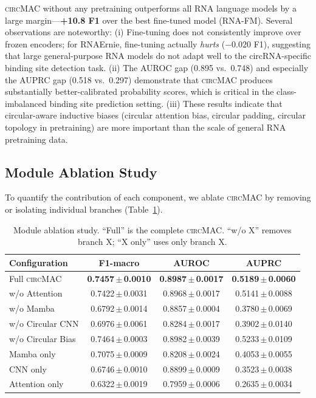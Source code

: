 \documentclass[11pt]{article}
\newcommand{\model}{\textsc{circMAC}}
\newcommand{\best}[1]{\textbf{#1}}
\newcommand{\spm}{\,\ensuremath{\pm}\,}
\begin{document}
\model{} without any pretraining outperforms all RNA language models by a
large margin---\textbf{+10.8 F1} over the best fine-tuned model (RNA-FM).
Several observations are noteworthy:
(i) Fine-tuning does not consistently improve over frozen encoders;
for RNAErnie, fine-tuning actually \textit{hurts} ($-0.020$ F1), suggesting
that large general-purpose RNA models do not adapt well to the
circRNA-specific binding site detection task.
(ii) The AUROC gap (0.895 vs.~0.748) and especially the AUPRC gap (0.518
vs.~0.297) demonstrate that \model{} produces substantially better-calibrated
probability scores, which is critical in the class-imbalanced binding site
prediction setting.
(iii) These results indicate that circular-aware inductive biases
(circular attention bias, circular padding, circular topology in pretraining)
are more important than the scale of general RNA pretraining data.


\subsection{Module Ablation Study}
\label{sec:ablation}

To quantify the contribution of each component, we ablate \model{} by
removing or isolating individual branches (Table~\ref{tab:ablation}).

\begin{table}[htbp]
\centering
\caption{Module ablation study. ``Full'' is the complete \model{}.
         ``w/o X'' removes branch X; ``X only'' uses only branch X.}
\label{tab:ablation}
\renewcommand{\arraystretch}{1.15}
\begin{tabular}{lccc}
\toprule
\textbf{Configuration} & \textbf{F1-macro} & \textbf{AUROC} & \textbf{AUPRC} \\
\midrule
Full \model{}         & \best{0.7457\spm 0.0010} & \best{0.8987\spm 0.0017} & \best{0.5189\spm 0.0060} \\
\midrule
w/o Attention         & 0.7422\spm 0.0031 & 0.8968\spm 0.0017 & 0.5141\spm 0.0088 \\
w/o Mamba             & 0.6792\spm 0.0014 & 0.8857\spm 0.0004 & 0.3780\spm 0.0069 \\
w/o Circular CNN      & 0.6976\spm 0.0061 & 0.8284\spm 0.0017 & 0.3902\spm 0.0140 \\
w/o Circular Bias     & 0.7464\spm 0.0003 & 0.8982\spm 0.0039 & 0.5233\spm 0.0109 \\
\midrule
Mamba only            & 0.7075\spm 0.0009 & 0.8208\spm 0.0024 & 0.4053\spm 0.0055 \\
CNN only              & 0.6746\spm 0.0010 & 0.8899\spm 0.0009 & 0.3523\spm 0.0038 \\
Attention only        & 0.6322\spm 0.0019 & 0.7959\spm 0.0006 & 0.2635\spm 0.0034 \\
\bottomrule
\end{tabular}
\end{table}
\end{document}
